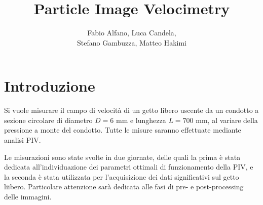 \documentclass{article} %
\title{\huge Particle Image Velocimetry}
\author{Fabio Alfano, Luca Candela,\\Stefano Gambuzza, Matteo Hakimi}
\date{}
\begin{document}
\maketitle

\clearpage
\tableofcontents
\clearpage

\section{Introduzione}
Si vuole misurare il campo di velocità di un getto libero uscente da un condotto a sezione circolare di  diametro $D = 6$ mm e lunghezza $L = 700$ mm, al variare della pressione a monte del condotto. Tutte le misure saranno effettuate mediante analisi PIV.\par
Le misurazioni sono state svolte in due giornate, delle quali la prima è stata dedicata all'individuazione dei parametri ottimali di funzionamento della PIV, e la seconda è stata utilizzata per l'acquisizione dei dati significativi sul getto liibero. Particolare attenzione sarà dedicata alle fasi di pre- e post-processing delle immagini.
\end{document}
